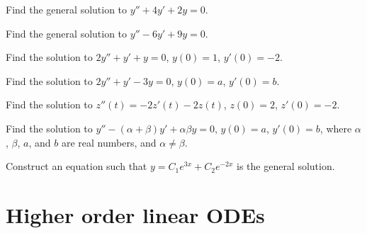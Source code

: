 \setcounter{exercise}{100}

\begin{exercise}
Find the general solution to
$y''+4y'+2y=0$.
\end{exercise}

\begin{exercise}
Find the general solution to
$y''-6y'+9y=0$.
\end{exercise}

\begin{exercise}
Find the solution to
$2y''+y'+y=0$, $y(0) = 1$, $y'(0)=-2$.
\end{exercise}

\begin{exercise}
Find the solution to
$2y''+y'-3y=0$, $y(0) = a$, $y'(0)=b$.
\end{exercise}

\begin{exercise}
Find the solution to
$z''(t) = -2z'(t)-2z(t)$, $z(0) = 2$, $z'(0)= -2$.
\end{exercise}

\begin{exercise}
Find the solution to
$y''-(\alpha+\beta) y' + \alpha \beta y=0$, $y(0) = a$, $y'(0)=b$,
where $\alpha$, $\beta$, $a$, and $b$ are real numbers, and $\alpha \not=
\beta$.
\end{exercise}

\begin{exercise}
Construct an equation such that $y = C_1 e^{3x} + C_2 e^{-2x}$ is the general
solution.
\end{exercise}


\sectionnewpage
\section{Higher order linear ODEs} \label{sec:hol}


